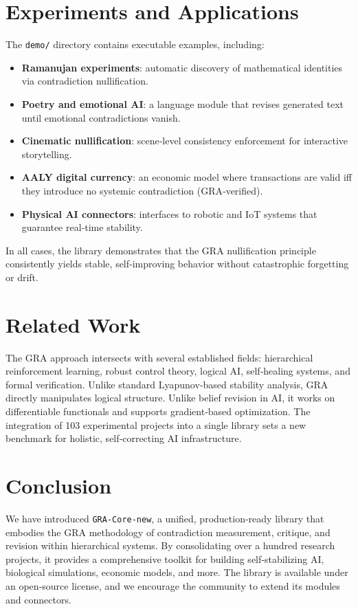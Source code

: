 \documentclass[11pt,a4paper]{article}
\begin{document}
\section{Experiments and Applications}
The \texttt{demo/} directory contains executable examples, including:
\begin{itemize}
    \item \textbf{Ramanujan experiments}: automatic discovery of mathematical identities via contradiction nullification.
    \item \textbf{Poetry and emotional AI}: a language module that revises generated text until emotional contradictions vanish.
    \item \textbf{Cinematic nullification}: scene‑level consistency enforcement for interactive storytelling.
    \item \textbf{AALY digital currency}: an economic model where transactions are valid iff they introduce no systemic contradiction (GRA‑verified).
    \item \textbf{Physical AI connectors}: interfaces to robotic and IoT systems that guarantee real‑time stability.
\end{itemize}

In all cases, the library demonstrates that the GRA nullification principle consistently yields stable, self‑improving behavior without catastrophic forgetting or drift.

\section{Related Work}
The GRA approach intersects with several established fields: hierarchical reinforcement learning, robust control theory, logical AI, self‑healing systems, and formal verification. Unlike standard Lyapunov‑based stability analysis, GRA directly manipulates logical structure. Unlike belief revision in AI, it works on differentiable functionals and supports gradient‑based optimization. The integration of 103 experimental projects into a single library sets a new benchmark for holistic, self‑correcting AI infrastructure.

\section{Conclusion}
We have introduced \texttt{GRA-Core-new}, a unified, production‑ready library that embodies the GRA methodology of contradiction measurement, critique, and revision within hierarchical systems. By consolidating over a hundred research projects, it provides a comprehensive toolkit for building self‑stabilizing AI, biological simulations, economic models, and more. The library is available under an open‑source license, and we encourage the community to extend its modules and connectors.
\end{document}
